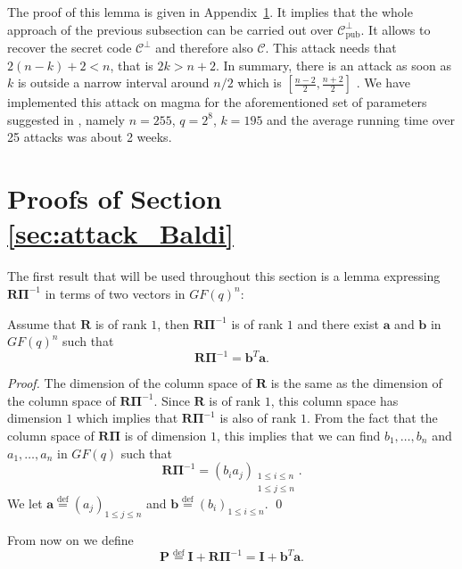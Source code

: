 \documentclass[runningheads,11pt]{llncs}
\newcommand{\eqdef}{\stackrel{\text{def}}{=}}
\newcommand{\code}[1]{\ensuremath{\mathscr{#1}}}
\newcommand{\Cpub}{\code{C}_{\text{pub}}}
\newcommand{\CC}{\code{C}}
\newcommand{\word}[1]{\ensuremath{\boldsymbol{#1}}}
\newcommand{\av}{\word{a}}
\newcommand{\bv}{\word{b}}
\newcommand{\mat}[1]{\ensuremath{\boldsymbol{#1}}}
\renewcommand{\Im}{\mat{I}}
\newcommand{\Pm}{\mat{P}}
\newcommand{\Pim}{\mat{\Pi}}
\newcommand{\Rm}{\mat{R}}
\newcommand{\fq}{GF(q)}
\begin{document}
The proof of this lemma is given in Appendix~\ref{appendixBaldi}. It implies that the whole approach of the previous subsection can be 
carried out over $\Cpub^\perp$. It allows to recover the secret code $\CC^\perp$ and therefore also $\CC$. This attack needs
that $2(n-k)+2 < n$, that is $2k > n+2$. In summary, there is an attack as soon as $k$ is outside a narrow interval around
$n/2$ which is $[\frac{n-2}{2},\frac{n+2}{2}]$ . We have implemented
this attack on magma for the aforementioned set of parameters suggested
in \cite{BBCRS11a}, namely $n=255$, $q=2^8$, $k=195$ 
and the average running time over 25 attacks was about 2 weeks.






\newpage




\newpage
\appendix
  
\newpage 

 \section{Proofs of Section \ref{sec:attack_Baldi}} \label{appendixBaldi}
 
 The first result that will be used throughout this section is a lemma expressing
 $\Rm \Pim^{-1}$ in terms of two vectors in $\fq^n$:
 \begin{lemma}
 \label{lem:RPi-1}
 Assume that $\Rm$ is of rank $1$, then $\Rm \Pim^{-1}$ is of rank $1$ and there exist $\av$ and $\bv$ in $\fq^n$ such that
 $$
 \Rm \Pim^{-1} = \bv^T \av.
 $$
 \end{lemma}
 \begin{proof}
 The dimension of the column space of $\Rm$ is the same as the dimension of the column space of
 $\Rm \Pim^{-1}$. Since $\Rm$ is of rank $1$, this column space has dimension $1$ which implies
 that $\Rm \Pim^{-1}$ is also of rank $1$. From the fact that the column space of $\Rm \Pim$ is of dimension $1$, this implies 
 that we can find $b_1,\dots,b_n$ and $a_1,\dots,a_n$ in $\fq$ such that 
 $$
 \Rm \Pim^{-1} = (b_i a_j)_{\substack{1 \leqslant  i \leqslant  n\\ 1 \leqslant  j \leqslant  n}}.
 $$
 We let $\av \eqdef (a_j)_{1 \leqslant  j \leqslant  n}$ and $\bv \eqdef (b_i)_{1 \leqslant  i \leqslant  n}$.
 \qed
 \end{proof}
 
 From now on we define
 $$\Pm \eqdef \Im + \Rm \Pim^{-1} = \Im + \bv^T \av.$$
 
\end{document}
